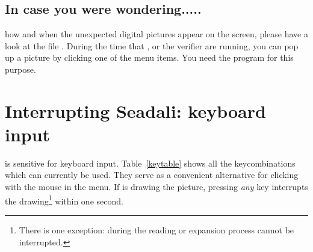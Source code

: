 \subsection{In case you were wondering.....}
how and when the unexpected digital pictures appear on the screen, please
have a look at the file . During the time that
,  or the verifier are running, you can pop up a
picture by clicking one of the menu items. You need the program  for
this purpose. 

\section{Interrupting Seadali: keyboard input}
 is sensitive for keyboard input. Table~\ref{keytable} shows all
the keycombinations which can currently be used. They serve as a convenient
alternative for clicking with the mouse in the menu. If  is
drawing the picture, pressing {\em any} key interrupts the
drawing\footnote{There is one exception: during the reading or expansion
process  cannot be interrupted.} within one second. 

